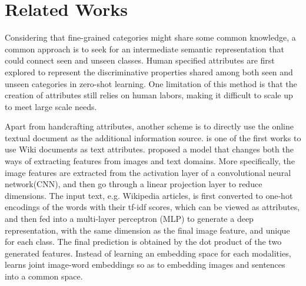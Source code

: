 \documentclass{article}
\begin{document}


\section{Related Works}    
Considering that fine-grained categories might share some common knowledge, a common approach is to seek for an intermediate semantic representation that could connect seen and unseen classes. Human specified attributes are first explored to represent the discriminative properties shared among both seen and unseen categories in zero-shot learning\cite{torresani2010efficient, lampert2009learning}. One limitation of this method is that the creation of attributes still relies on human labors, making it difficult to scale up to meet large scale needs. \par 


Apart from handcrafting attributes, another scheme is to directly use the online textual document as the additional information source. \cite{Elhoseiny2013} is one of the first works to use Wiki documents as text attributes. \cite{Ba_2015_ICCV} proposed a model that changes both the ways of extracting features from images and text domains. More specifically, the image features are extracted from the activation layer of a convolutional neural network(CNN), and then go through a linear projection layer to reduce dimensions. The input text, e.g. Wikipedia articles, is first converted to one-hot encodings of the words with their tf-idf scores, which can be viewed as attributes, and then fed into a multi-layer perceptron (MLP) to generate a deep representation, with the same dimension as the final image feature, and unique for each class. The final prediction is obtained by the dot product of the two generated features. Instead of learning an embedding space for each modalities, \cite{frome2013devise} learns joint image-word embeddings so as to embedding images and sentences into a common space.\\
	
\end{document}
